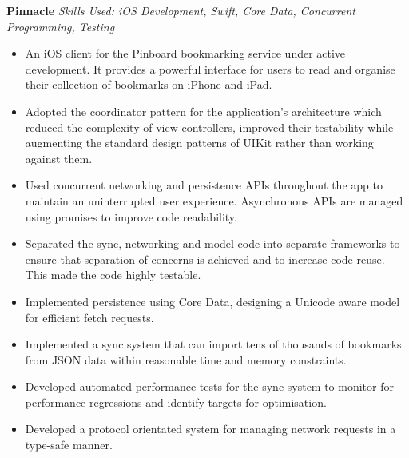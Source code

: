\textbf{Pinnacle}  \newline
\textit{Skills Used: iOS Development, Swift, Core Data, Concurrent Programming, Testing}
%
\begin{itemize}[leftmargin=0mm]
\item An iOS client for the Pinboard bookmarking service under active
  development. It provides a powerful interface for users to read and organise
  their collection of bookmarks on iPhone and iPad.
\item Adopted the coordinator pattern for the application's architecture which
  reduced the complexity of view controllers, improved their testability while
  augmenting the standard design patterns of UIKit rather than working against
  them.
\item Used concurrent networking and persistence APIs throughout the app to
  maintain an uninterrupted user experience. Asynchronous APIs are managed using
  promises to improve code readability.
\item Separated the sync, networking and model code into separate frameworks to
  ensure that separation of concerns is achieved and to increase code
  reuse. This made the code highly testable.
\item Implemented persistence using Core Data, designing a Unicode aware model
  for efficient fetch requests.
\item Implemented a sync system that can import tens of thousands of bookmarks
  from JSON data within reasonable time and memory constraints.
\item Developed automated performance tests for the sync system to monitor for
  performance regressions and identify targets for optimisation.
\item Developed a protocol orientated system for managing network requests in a
  type-safe manner.
\end{itemize}

